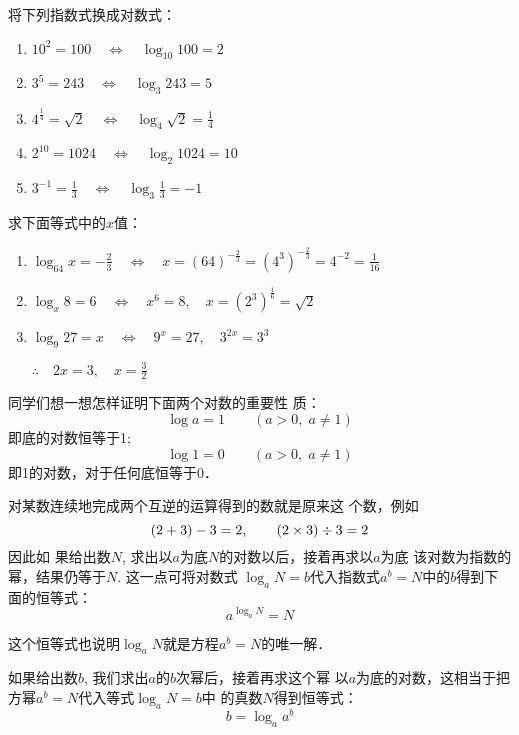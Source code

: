 \begin{example}
    将下列指数式换成对数式：
\begin{enumerate}
    \item $10^2=100\quad \Longleftrightarrow \quad \log_{10}100= 2$
    \item $3^5=243\quad \Longleftrightarrow \quad\log_3 243=5$
    \item $4^{\tfrac{1}{4}}=\sqrt{2}\quad \Longleftrightarrow \quad \log_4\sqrt{2}=\frac{1}{4}$
    \item $2^10=1024\quad \Longleftrightarrow \quad \log_2 1024=10$
    \item $3^{-1}=\frac{1}{3}\quad \Longleftrightarrow \quad \log_3\frac{1}{3}=-1$
\end{enumerate}
\end{example}



\begin{example}
    求下面等式中的$x$值：
\begin{enumerate}
    \item $\log_{64}x=-\frac{2}{3}  \quad \Longleftrightarrow \quad x=(64)^{-\tfrac{2}{3}}=\left(4^3\right)^{-\tfrac{2}{3}}=4^{-2}=\frac{1}{16} $
    \item  $ \log_x 8 =6 \quad \Longleftrightarrow \quad x^6=8,\quad x=(2^3)^{\tfrac{1}{6}}=\sqrt{2} $
    \item  $ \log_9 27=x \quad \Longleftrightarrow \quad 9^x=27,\quad 3^{2x}=3^3 $
    
    $\therefore\quad 2x=3,\quad x=\frac{3}{2}$
\end{enumerate}
\end{example}

同学们想一想怎样证明下面两个对数的重要性
质：
\[\log a=1\qquad (a>0,\; a\ne 1)\]
即底的对数恒等于1;
\[\log 1=0\qquad (a>0,\; a\ne 1)\]
即1的对数，对于任何底恒等于0．

对某数连续地完成两个互逆的运算得到的数就是原来这
个数，例如
$$(2+3)-3=2,\qquad (2\times3)\div 3=2$$
因此如
果给出数$N$, 求出以$a$为底$N$的对数以后，接着再求以$a$为底
该对数为指数的幂，结果仍等于$N$. 这一点可将对数式
$\log_a N=b$代入指数式$a^b=N$中的$b$得到下面的恒等式：
\begin{equation}
    a^{\log_a N}=N
\end{equation}

这个恒等式也说明$\log_a N$就是方程$a^b=N$的唯一解．

如果给出数$b$, 我们求出$a$的$b$次幂后，接着再求这个幂
以$a$为底的对数，这相当于把方幂$a^b=N$代入等式$\log_a N=b$中
的真数$N$得到恒等式：
\begin{equation}
    b=\log_a a^b
\end{equation}




